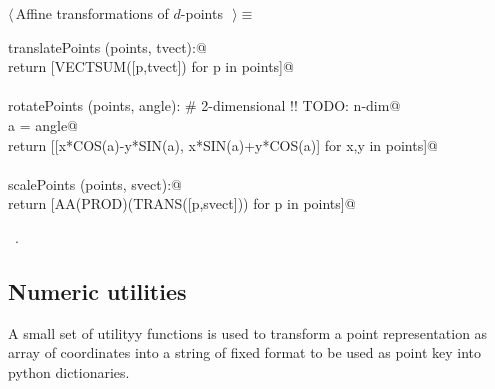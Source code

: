 \documentclass[11pt,oneside]{article}	%
\begin{document}
\begin{flushleft} \small \label{scrap49}
$\langle\,$Affine transformations of $d$-points\nobreak\ {\footnotesize {}}$\,\rangle\equiv$
\vspace{-1ex}
\begin{list}{}{} \item
\mbox{}\verb@def translatePoints (points, tvect):@\\
\mbox{}\verb@   return [VECTSUM([p,tvect]) for p in points]@\\
\mbox{}\verb@@\\
\mbox{}\verb@def rotatePoints (points, angle):      # 2-dimensional !! TODO: n-dim@\\
\mbox{}\verb@   a = angle@\\
\mbox{}\verb@   return [[x*COS(a)-y*SIN(a), x*SIN(a)+y*COS(a)] for x,y in points]@\\
\mbox{}\verb@@\\
\mbox{}\verb@def scalePoints (points, svect):@\\
\mbox{}\verb@   return [AA(PROD)(TRANS([p,svect])) for p in points]@\\
\mbox{}\verb@@{\NWsep}
\end{list}
\vspace{-1ex}
\footnotesize\addtolength{\baselineskip}{-1ex}
\begin{list}{}{\setlength{\itemsep}{-\parsep}\setlength{\itemindent}{-\leftmargin}}
\item \NWtxtMacroRefIn\ .
\end{list}
\end{flushleft}

\subsection{Numeric utilities}

A small set of utilityy functions is used to transform a point representation as array of coordinates into a string of fixed format to be used as point key into python dictionaries.
\end{document}
